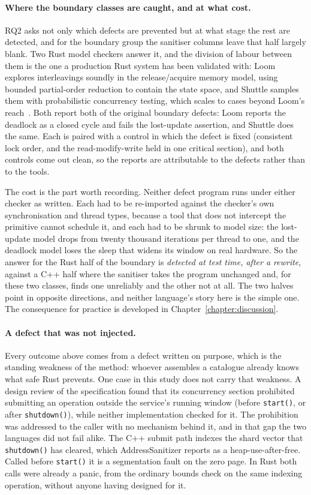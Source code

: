 \documentclass[english,twoside,openright,a4paper,censored,csm,software-track-2020]{HYthesisML}
\begin{document}
\paragraph{Where the boundary classes are caught, and at what cost.}
RQ2 asks not only which defects are prevented but at what stage the rest are detected, and for
the boundary group the sanitiser columns leave that half largely blank. Two Rust model
checkers answer it, and the division of labour between them is the one a production Rust system
has been validated with: Loom explores interleavings soundly in the release/acquire memory
model, using bounded partial-order reduction to contain the state space, and Shuttle samples
them with probabilistic concurrency testing, which scales to cases beyond Loom's
reach~\cite{bornholt2021shardstore}. Both report both
of the original boundary defects: Loom reports the deadlock as a closed cycle and fails the
lost-update assertion, and Shuttle does the same. Each is paired with a control in which the
defect is fixed (consistent lock order, and the read-modify-write held in one critical
section), and both controls come out clean, so the reports are attributable to the defects
rather than to the tools.

The cost is the part worth recording. Neither defect program runs under either checker as
written. Each had to be re-imported against the checker's own synchronisation and thread types,
because a tool that does not intercept the primitive cannot schedule it, and each had to be
shrunk to model size: the lost-update model drops from twenty thousand iterations per thread to
one, and the deadlock model loses the sleep that widens its window on real hardware. So the
answer for the Rust half of the boundary is \emph{detected at test time, after a rewrite},
against a C++ half where the sanitiser takes the program unchanged and, for these two classes,
finds one unreliably and the other not at all. The two halves point in opposite directions, and
neither language's story here is the simple one. The consequence for practice is developed in
Chapter~\ref{chapter:discussion}.

\paragraph{A defect that was not injected.}
Every outcome above comes from a defect written on purpose, which is the standing weakness of
the method: whoever assembles a catalogue already knows what safe Rust prevents. One case in
this study does not carry that weakness. A design review of the specification found that its
concurrency section prohibited submitting an operation outside the service's running window
(before \texttt{start()}, or after \texttt{shutdown()}), while neither implementation checked
for it. The prohibition was addressed to the caller with no mechanism behind it, and in that gap
the two languages did not fail alike. The C++ submit path indexes the shard vector that
\texttt{shutdown()} has cleared, which AddressSanitizer reports as a heap-use-after-free. Called
before \texttt{start()} it is a segmentation fault on the zero page. In Rust both calls were
already a panic, from the ordinary bounds check on the same indexing operation, without anyone
having designed for it.
\end{document}
